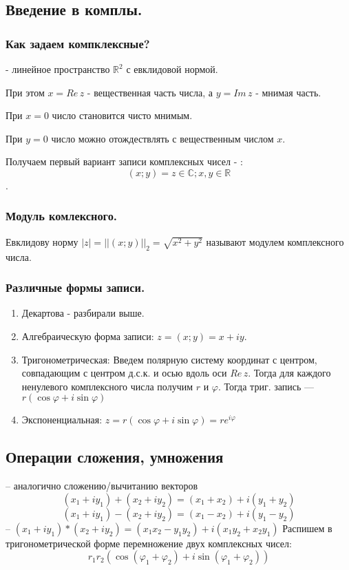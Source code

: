\subsection{Введение в комплы.}

\subsubsection{Как задаем компклексные?}

 - линейное пространство $\mathbb{R}^2$ с евклидовой нормой.

При этом $x=Re\,z$ - вещественная часть числа, а $y=Im\,z$ - мнимая часть.

При $x=0$ число становится чисто мнимым.

При $y=0$ число можно отождествлять с вещественным числом $x$.

Получаем первый вариант записи комплексных чисел - : $$(x; y)=z\in\mathbb{C}; x, y\in\mathbb{R}$$.

\subsubsection{Модуль комлексного.}
Евклидову норму $|z|=||(x;y)||_2=\sqrt{x^2 + y^2}$ называют модулем комплексного числа.


\subsubsection{Различные формы записи.}
\begin{enumerate}
    \item Декартова - разбирали выше.
    \item Алгебраическую форма записи: $z=(x;y)=x+iy$.
    \item Тригонометрическая:
   Введем полярную систему координат с центром, совпадающим с центром д.с.к. и осью вдоль оси $Re\,z$. Тогда для каждого ненулевого комплексного числа получим $r$ и $\varphi$. Тогда триг. запись ---  $r (\cos \varphi + i \sin \varphi)$
   \item Экспоненциальная: $z=r(\cos{\varphi}+i\sin{\varphi})=re^{i\varphi}$
\end{enumerate}

\subsection{Операции сложения, умножения}
 -- аналогично сложению/вычитанию векторов
          $$(x_1 + iy_1) + (x_2 + iy_2) = (x_1 + x_2) + i(y_1 + y_2)$$
          $$(x_1 + iy_1) - (x_2 + iy_2) = (x_1 - x_2) + i(y_1 - y_2)$$
 --
         $ (x_1 + iy_1) * (x_2 + iy_2) = (x_1x_2 - y_1y_2) + i(x_1y_2 + x_2y_1)$
          Распишем в тригонометрической форме перемножение двух комплексных чисел:
          $$r_1r_2(\cos{(\varphi_1 + \varphi_2)} + i\sin{(\varphi_1 + \varphi_2)})$$
